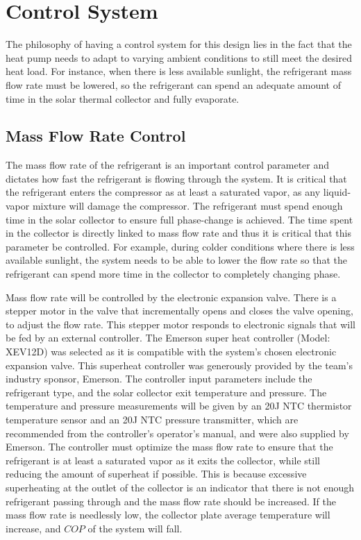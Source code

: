 \section{Control System}

The philosophy of having a control system for this design lies in the fact that the heat pump needs to adapt to varying ambient conditions to still meet the desired heat load. For instance, when there is less available sunlight, the refrigerant mass flow rate must be lowered, so the refrigerant can spend an adequate amount of time in the solar thermal collector and fully evaporate.

\subsection{Mass Flow Rate Control}

The mass flow rate of the refrigerant is an important control parameter and dictates how fast the refrigerant is flowing through the system. It is critical that the refrigerant enters the compressor as at least a saturated vapor, as any liquid-vapor mixture will damage the compressor. The refrigerant must spend enough time in the solar collector to ensure full phase-change is achieved. The time spent in the collector is directly linked to mass flow rate and thus it is critical that this parameter be controlled. For example, during colder conditions where there is less available sunlight, the system needs to be able to lower the flow rate so that the refrigerant can spend more time in the collector to completely changing phase.

\medskip
Mass flow rate will be controlled by the electronic expansion valve. There is a stepper motor in the valve that incrementally opens and closes the valve opening, to adjust the flow rate. This stepper motor responds to electronic signals that will be fed by an external controller. The Emerson super heat controller (Model: XEV12D) was selected as it is compatible with the system’s chosen electronic expansion valve. This superheat controller was generously provided by the team’s industry sponsor, Emerson. The controller input parameters include the refrigerant type, and the solar collector exit temperature and pressure. The temperature and pressure measurements will be given by an 20J NTC thermistor temperature sensor and an 20J NTC pressure transmitter, which are recommended from the controller’s operator’s manual, and were also supplied by Emerson. The controller must optimize the mass flow rate to ensure that the refrigerant is at least a saturated vapor as it exits the collector, while still reducing the amount of superheat if possible. This is because excessive superheating at the outlet of the collector is an indicator that there is not enough refrigerant passing through and the mass flow rate should be increased. If the mass flow rate is needlessly low, the collector plate average temperature will increase, and $COP$ of the system will fall.

